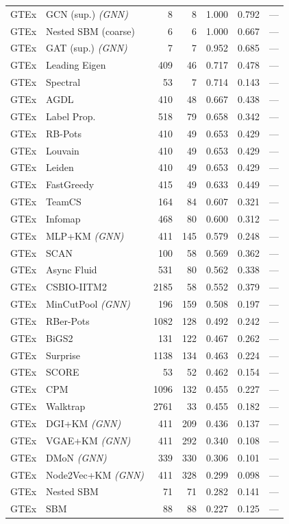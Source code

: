 \begin{longtable}{llrrrrr}
\midrule
GTEx & GCN (sup.) \textit{(GNN)} & 8 & 8 & 1.000 & 0.792 & --- \\
GTEx & Nested SBM (coarse) & 6 & 6 & 1.000 & 0.667 & --- \\
GTEx & GAT (sup.) \textit{(GNN)} & 7 & 7 & 0.952 & 0.685 & --- \\
GTEx & Leading Eigen & 409 & 46 & 0.717 & 0.478 & --- \\
GTEx & Spectral & 53 & 7 & 0.714 & 0.143 & --- \\
GTEx & AGDL & 410 & 48 & 0.667 & 0.438 & --- \\
GTEx & Label Prop. & 518 & 79 & 0.658 & 0.342 & --- \\
GTEx & RB-Pots & 410 & 49 & 0.653 & 0.429 & --- \\
GTEx & Louvain & 410 & 49 & 0.653 & 0.429 & --- \\
GTEx & Leiden & 410 & 49 & 0.653 & 0.429 & --- \\
GTEx & FastGreedy & 415 & 49 & 0.633 & 0.449 & --- \\
GTEx & TeamCS & 164 & 84 & 0.607 & 0.321 & --- \\
GTEx & Infomap & 468 & 80 & 0.600 & 0.312 & --- \\
GTEx & MLP+KM \textit{(GNN)} & 411 & 145 & 0.579 & 0.248 & --- \\
GTEx & SCAN & 100 & 58 & 0.569 & 0.362 & --- \\
GTEx & Async Fluid & 531 & 80 & 0.562 & 0.338 & --- \\
GTEx & CSBIO-IITM2 & 2185 & 58 & 0.552 & 0.379 & --- \\
GTEx & MinCutPool \textit{(GNN)} & 196 & 159 & 0.508 & 0.197 & --- \\
GTEx & RBer-Pots & 1082 & 128 & 0.492 & 0.242 & --- \\
GTEx & BiGS2 & 131 & 122 & 0.467 & 0.262 & --- \\
GTEx & Surprise & 1138 & 134 & 0.463 & 0.224 & --- \\
GTEx & SCORE & 53 & 52 & 0.462 & 0.154 & --- \\
GTEx & CPM & 1096 & 132 & 0.455 & 0.227 & --- \\
GTEx & Walktrap & 2761 & 33 & 0.455 & 0.182 & --- \\
GTEx & DGI+KM \textit{(GNN)} & 411 & 209 & 0.436 & 0.137 & --- \\
GTEx & VGAE+KM \textit{(GNN)} & 411 & 292 & 0.340 & 0.108 & --- \\
GTEx & DMoN \textit{(GNN)} & 339 & 330 & 0.306 & 0.101 & --- \\
GTEx & Node2Vec+KM \textit{(GNN)} & 411 & 328 & 0.299 & 0.098 & --- \\
GTEx & Nested SBM & 71 & 71 & 0.282 & 0.141 & --- \\
GTEx & SBM & 88 & 88 & 0.227 & 0.125 & --- \\
\midrule
\bottomrule
\end{longtable}
